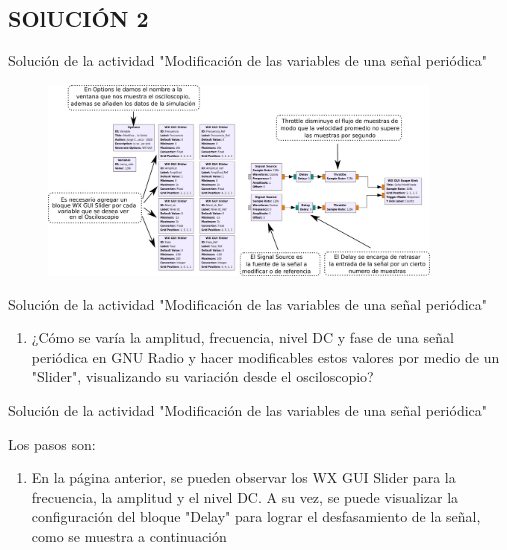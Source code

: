 \subsection{SOlUCIÓN 2}
	
	\begin{frame}{Solución de la actividad "Modificación de las variables de una señal periódica"}
	\begin{figure}[H]
		\vspace{-3mm}
		\centering
		\includegraphics[width=0.9\textwidth]{soluciones/actividad-1-2/pdf/Mon.pdf}
		\end{figure}
	\end{frame}
    
    \begin{frame}{Solución de la actividad "Modificación de las variables de una señal periódica"}
    \begin{enumerate}[1.]
    
    \item{¿Cómo se varía la amplitud, frecuencia, nivel DC y fase de una señal periódica en GNU Radio y hacer modificables estos valores por medio de un "Slider", visualizando su variación desde el osciloscopio?}\\
    
    \end{enumerate}
    \end{frame}
    
    	\begin{frame}{Solución de la actividad "Modificación de las variables de una señal periódica"}
    	
	Los pasos son:
	\begin{enumerate}[1.]

	\item {En la página anterior, se pueden observar los WX GUI Slider para la frecuencia, la amplitud y el nivel DC. A su vez, se puede visualizar la configuración del bloque "Delay" para lograr el desfasamiento de la señal, como se muestra a continuación}\\
	
	\end{enumerate}
	\end{frame}
	
